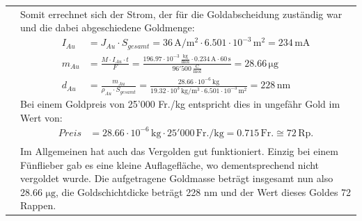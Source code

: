 \begin{longtable}{p{3cm}p{14cm}}
    & Somit errechnet sich der Strom, der für die Goldabscheidung zuständig war und die dabei abgeschiedene Goldmenge:
    $$\begin{aligned}
        I_{Au} &= J_{Au} \cdot S_{gesamt} = 36 \, \mathrm{A/m^2} \cdot 6.501 \cdot 10^{-3} \, \mathrm{m^2} = 234 \, \mathrm{mA}\\
        m_{Au} &= \frac{M \cdot I_{Au} \cdot t}{F} = \frac{196.97 \cdot 10^{-3} \, \frac{\mathrm{kg}}{\mathrm{mol}} \cdot 0.234 \, \mathrm{A} \cdot 60 \, \mathrm{s}}{96'500 \, \frac{\mathrm{C}}{\mathrm{mol}}} = 28.66 \, \mathrm{\mu g}\\
        d_{Au} &= \frac{m_{Au}}{\rho_{Au} \cdot S_{gesamt}} = \frac{28.66 \cdot 10^{-6} \, \mathrm{kg}}{19.32 \cdot 10^3 \, \mathrm{kg/m^3} \cdot 6.501 \cdot 10^{-3} \, \mathrm{m^2}} = 228 \, \mathrm{nm}
    \end{aligned}$$
    Bei einem Goldpreis von 25'000 Fr./kg entspricht dies in ungefähr Gold im Wert von:
    $$\begin{aligned}
        Preis &= 28.66 \cdot 10^{-6} \, \mathrm{kg} \cdot 25'000 \, \mathrm{Fr./kg} = 0.715  \, \mathrm{Fr.} \cong 72 \, \mathrm{Rp.}
    \end{aligned}$$\\
    
    & Im Allgemeinen hat auch das Vergolden gut funktioniert. Einzig bei einem Fünflieber gab es eine kleine Auflagefläche, wo dementsprechend nicht vergoldet wurde. Die aufgetragene Goldmasse beträgt insgesamt nun also 28.66 $\mathrm{\mu g}$, die Goldschichtdicke beträgt 228 nm und der Wert dieses Goldes 72 Rappen.
    
\end{longtable}